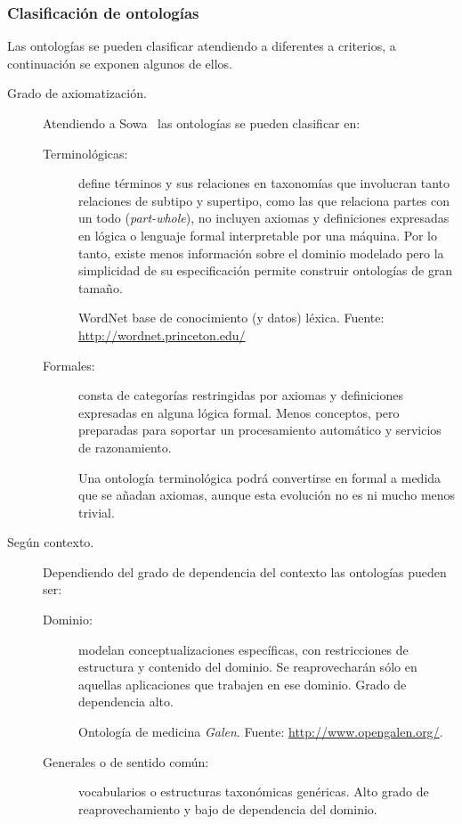 \subsubsection{Clasificación de ontologías}
Las ontologías se pueden clasificar atendiendo a diferentes a criterios, a
continuación se exponen algunos de ellos.
\begin{description}
 \item [Grado de axiomatización.] Atendiendo a Sowa~\cite{Sowa99knowledge} las ontologías se pueden clasificar en:
\begin{description}
\item[Terminológicas:] define términos y sus relaciones en taxonomías que
involucran tanto relaciones de subtipo y supertipo, como las que relaciona
partes con un todo (\textit{part-whole}), no incluyen axiomas y definiciones
expresadas en lógica o lenguaje formal interpretable por una máquina. Por lo
tanto, existe menos información sobre el dominio modelado pero la simplicidad de
su especificación permite construir ontologías de gran tamaño.
\begin{example}
WordNet base de conocimiento (y datos) léxica.
Fuente: \url{http://wordnet.princeton.edu/}
\end{example}

\item[Formales:] consta de categorías restringidas por axiomas y definiciones
expresadas en alguna lógica formal. Menos conceptos, pero preparadas para soportar
un procesamiento automático y servicios de razonamiento.

Una ontología terminológica podrá convertirse en formal a medida que se añadan
axiomas, aunque esta evolución no es ni mucho menos trivial.
\end{description}

\item[Según contexto.] Dependiendo del grado de dependencia del contexto las ontologías pueden ser:
\begin{description}
\item[Dominio:] modelan conceptualizaciones específicas, con restricciones de
estructura y contenido del dominio. Se reaprovecharán sólo en aquellas
aplicaciones que trabajen en ese dominio. Grado de dependencia alto.

\begin{example}
Ontología de medicina \textit{Galen}.
Fuente: \url{http://www.opengalen.org/}.
\end{example}

\item[Generales o de sentido común:] vocabularios o estructuras taxonómicas
genéricas. Alto grado de reaprovechamiento y bajo de dependencia del dominio.


\end{description}
\end{description}
